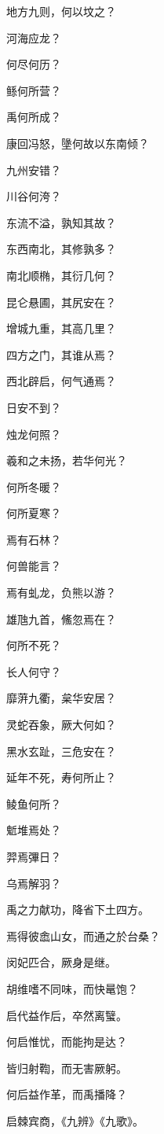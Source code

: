 \documentclass[12pt,a4paper]{ctexbook}
\begin{document}
地方九则，何以坟之？\par
河海应龙？\par
何尽何历？\par
鲧何所营？\par
禹何所成？\par
康回冯怒，墬何故以东南倾？\par
九州安错？\par
川谷何洿？\par
东流不溢，孰知其故？\par
东西南北，其修孰多？\par
南北顺椭，其衍几何？\par
昆仑悬圃，其尻安在？\par
增城九重，其高几里？\par
四方之门，其谁从焉？\par
西北辟启，何气通焉？\par
日安不到？\par
烛龙何照？\par
羲和之未扬，若华何光？\par
何所冬暖？\par
何所夏寒？\par
焉有石林？\par
何兽能言？\par
焉有虬龙，负熊以游？\par
雄虺九首，鯈忽焉在？\par
何所不死？\par
长人何守？\par
靡蓱九衢，枲华安居？\par
灵蛇吞象，厥大何如？\par
黑水玄趾，三危安在？\par
延年不死，寿何所止？\par
鲮鱼何所？\par
鬿堆焉处？\par
羿焉彃日？\par
乌焉解羽？\par
禹之力献功，降省下土四方。\par
焉得彼嵞山女，而通之於台桑？\par
闵妃匹合，厥身是继。\par
胡维嗜不同味，而快鼌饱？\par
启代益作后，卒然离蠥。\par
何启惟忧，而能拘是达？\par
皆归射鞫，而无害厥躬。\par
何后益作革，而禹播降？\par
启棘宾商，《九辨》《九歌》。\par
\end{document}
